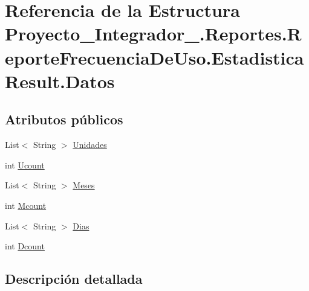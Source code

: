 \hypertarget{struct_proyecto___integrador__3_1_1_reportes_1_1_reporte_frecuencia_de_uso_1_1_estadistica_result_1_1_datos}{\section{Referencia de la Estructura Proyecto\-\_\-\-Integrador\-\_.\-Reportes.\-Reporte\-Frecuencia\-De\-Uso.\-Estadistica\-Result.\-Datos}
\label{struct_proyecto___integrador__3_1_1_reportes_1_1_reporte_frecuencia_de_uso_1_1_estadistica_result_1_1_datos}
}
\subsection*{Atributos públicos}
\begin{DoxyCompactItemize}
\item 
List$<$ String $>$ \hyperlink{struct_proyecto___integrador__3_1_1_reportes_1_1_reporte_frecuencia_de_uso_1_1_estadistica_result_1_1_datos_a81df80256c122959ba9bb1870d9085a5}{Unidades}
\item 
int \hyperlink{struct_proyecto___integrador__3_1_1_reportes_1_1_reporte_frecuencia_de_uso_1_1_estadistica_result_1_1_datos_a7651dc7d0f1617da0643e61950bdb90f}{Ucount}
\item 
List$<$ String $>$ \hyperlink{struct_proyecto___integrador__3_1_1_reportes_1_1_reporte_frecuencia_de_uso_1_1_estadistica_result_1_1_datos_afbcbe6e3c9c965594fef0598d21bfe56}{Meses}
\item 
int \hyperlink{struct_proyecto___integrador__3_1_1_reportes_1_1_reporte_frecuencia_de_uso_1_1_estadistica_result_1_1_datos_ad25bf6ba4f7854491cff1bfee985625c}{Mcount}
\item 
List$<$ String $>$ \hyperlink{struct_proyecto___integrador__3_1_1_reportes_1_1_reporte_frecuencia_de_uso_1_1_estadistica_result_1_1_datos_a58abd35a3f3a788c8709fd97f1565e3b}{Dias}
\item 
int \hyperlink{struct_proyecto___integrador__3_1_1_reportes_1_1_reporte_frecuencia_de_uso_1_1_estadistica_result_1_1_datos_aae16dcb9b5547d868529d858d9068c6d}{Dcount}
\end{DoxyCompactItemize}


\subsection{Descripción detallada}


